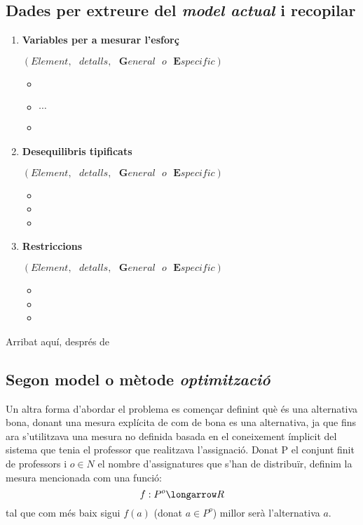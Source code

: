 \documentclass[10pt]{proc}
\newcommand{\esp}{\text{ }}
\begin{document}
\subsection{Dades per extreure del \textit{model actual} i recopilar}
\begin{enumerate}
	\item \textbf{Variables per a mesurar l'esforç} 
	
	$(Element,\esp detalls,\esp  \textbf{G}eneral \esp o \esp \textbf{E}specific)$
	\begin{itemize}
		\item 
		\item $\cdots$
		\item 
	\end{itemize}
\item \textbf{Desequilibris tipificats}

	$(Element,\esp detalls,\esp  \textbf{G}eneral \esp o \esp \textbf{E}specific)$
\begin{itemize}
	\item 
	\item 
	\item 
\end{itemize}
\item \textbf{Restriccions}

$(Element,\esp detalls,\esp  \textbf{G}eneral \esp o \esp \textbf{E}specific)$
\begin{itemize}
	\item 
	\item 
	\item 
\end{itemize}
\end{enumerate}
Arribat aquí, després de 
\\
\newpage
\begin{tcolorbox}[colframe=white,colback=redviolet!20,sharp corners=all,size=minimal,halign=center,valign=center]
\section{Segon model o mètode \textit{optimització}}
\end{tcolorbox}
Un altra forma d'abordar el problema es començar definint què és una alternativa bona, donant una mesura explícita de com de bona es una alternativa, ja que fins ara s'utilitzava una mesura no definida basada en el coneixement ímplicit del sistema que tenia el professor que realitzava l'assignació. Donat P el conjunt finit de professors i $o \in N$ el nombre d'assignatures que s'han de distribuïr, definim la mesura mencionada com una funció:
$$f: P^o \longarrow R$$
tal que com més baix sigui $f(a)$ (donat $a \in P^o$) millor serà l'alternativa $a$.
\end{document}
